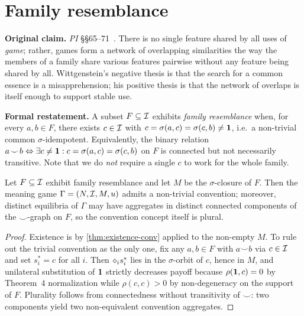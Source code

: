 \section{Family resemblance}\label{sec:family-resemblance}

\textbf{Original claim.} \emph{PI} \S\S65--71~\cite{Wittgenstein1953}.
There is no single feature shared by all uses of \emph{game}; rather,
games form a network of overlapping similarities the way the members of
a family share various features pairwise without any feature being
shared by all. Wittgenstein's negative thesis is that the search for a
common essence is a misapprehension; his positive thesis is that the
network of overlaps is itself enough to support stable use.

\textbf{Formal restatement.} A subset $F\subseteq\mathcal{I}$ exhibits
\emph{family resemblance} when, for every $a,b\in F$, there exists
$c\in\mathcal{I}$ with $c=\sigma(a,c)=\sigma(c,b)\neq\mathbf{1}$, i.e.\ a
non-trivial common $\sigma$-idempotent. Equivalently, the binary
relation $a\!\smile\!b\Leftrightarrow\exists c\neq\mathbf{1}:c=\sigma(a,c)=\sigma(c,b)$
on $F$ is connected but not necessarily transitive. Note that we do
\emph{not} require a single $c$ to work for the whole family.

\begin{theorem}\label{thm:family-resemblance}
Let $F\subseteq\mathcal{I}$ exhibit family resemblance and let $M$ be the
$\sigma$-closure of $F$. Then the meaning game $\Gamma=(N,\mathcal{I},M,u)$
admits a non-trivial convention; moreover, distinct equilibria of
$\Gamma$ may have aggregates in distinct connected components of the
$\smile$-graph on $F$, so the convention concept itself is plural.
\end{theorem}

\begin{proof}
Existence is by \cref{thm:existence-conv} applied to the non-empty
$M$. To rule out the trivial convention as the only one, fix any
$a,b\in F$ with $a\smile b$ via $c\in\mathcal{I}$ and set $s^\ast_i=c$ for
all $i$. Then $\diamond_i s^\ast_i$ lies in the $\sigma$-orbit of
$c$, hence in $M$, and unilateral substitution of $\mathbf{1}$ strictly
decreases payoff because $\rho(\mathbf{1},c)=0$ by Theorem~4 normalization
while $\rho(c,c)>0$ by non-degeneracy on the support of $F$. Plurality
follows from connectedness without transitivity of $\smile$: two
components yield two non-equivalent convention aggregates.
\end{proof}


